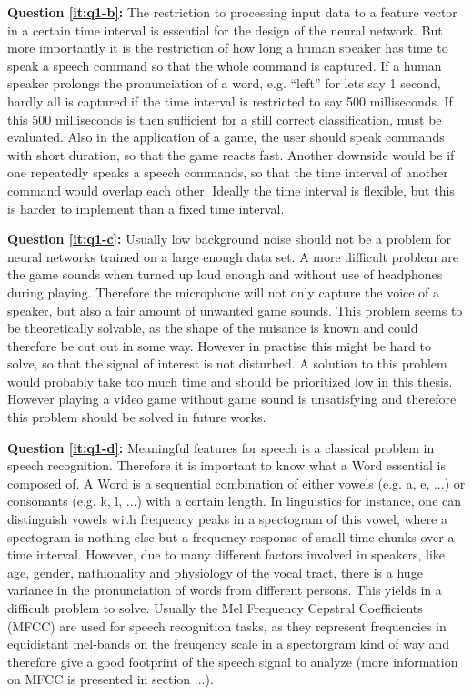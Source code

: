 \textbf{Question \ref{it:q1-b}:} 
The restriction to processing input data to a feature vector in a certain time interval is essential for the design of the neural network.
But more importantly it is the restriction of how long a human speaker has time to speak a speech command so that the whole command is captured. If a human speaker prolongs the pronunciation of a word, e.g. \enquote{left} for lets say 1 second, hardly all is captured if the time interval is restricted to say 500 milliseconds. If this 500 milliseconds is then sufficient for a still correct classification, must be evaluated. 
Also in the application of a game, the user should speak commands with short duration, so that the game reacts fast. Another downside would be if one repeatedly speaks a speech commands, so that the time interval of another command would overlap each other. Ideally the time interval is flexible, but this is harder to implement than a fixed time interval.

\textbf{Question \ref{it:q1-c}:}
Usually low background noise should not be a problem for neural networks trained on a large enough data set. 
A more difficult problem are the game sounds when turned up loud enough and without use of headphones during playing. 
Therefore the microphone will not only capture the voice of a speaker, but also a fair amount of unwanted game sounds. 
This problem seems to be theoretically solvable, as the shape of the nuisance is known and could therefore be cut out in some way. 
However in practise this might be hard to solve, so that the signal of interest is not disturbed. 
A solution to this problem would probably take too much time and should be prioritized low in this thesis. 
However playing a video game without game sound is unsatisfying and therefore this problem should be solved in future works.

\textbf{Question \ref{it:q1-d}:} 
Meaningful features for speech is a classical problem in speech recognition.
Therefore it is important to know what a Word essential is composed of. A Word is a sequential combination of either vowels (e.g. a, e, ...) or consonants (e.g. k, l, ...) with a certain length. In linguistics for instance, one can distinguish vowels with frequency peaks in a spectogram of this vowel, where a spectogram is nothing else but a frequency response of small time chunks over a time interval. 
However, due to many different factors involved in speakers, like age, gender, nathionality and physiology of the vocal tract, there is a huge variance in the pronunciation of words from different persons. 
This yields in a difficult problem to solve. 
Usually the Mel Frequency Cepstral Coefficients (MFCC) are used for speech recognition tasks, as they represent frequencies in equidistant mel-bands on the freuqency scale in a spectorgram kind of way and therefore give a good footprint of the speech signal to analyze (more information on MFCC is presented in section ...).
